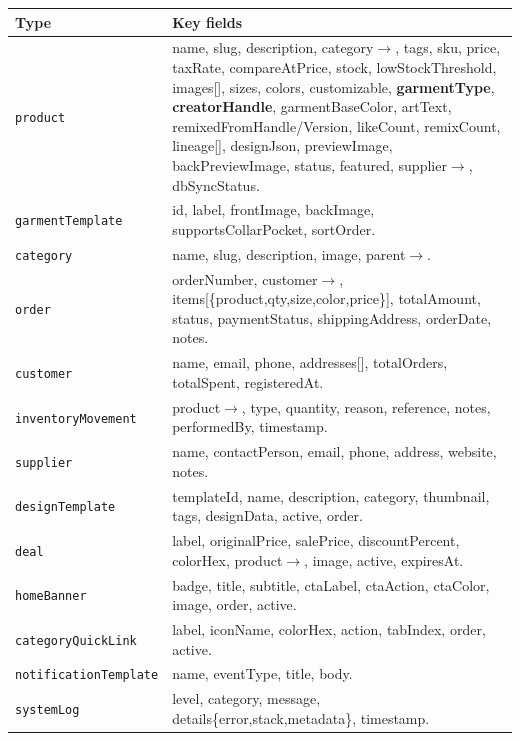\documentclass[11pt,a4paper]{report}
\newcommand{\code}[1]{\texttt{#1}}
\begin{document}
{\small
\begin{longtable}{@{}p{3.4cm}p{10.6cm}@{}}
\toprule
\textbf{Type} & \textbf{Key fields}\\
\midrule
\endhead
\code{product} & name, slug, description, category$\rightarrow$, tags, sku, price, taxRate,
  compareAtPrice, stock, lowStockThreshold, images[], sizes, colors, customizable,
  \textbf{garmentType}, \textbf{creatorHandle}, garmentBaseColor, artText,
  remixedFromHandle/Version, likeCount, remixCount, lineage[], designJson,
  previewImage, backPreviewImage, status, featured, supplier$\rightarrow$, dbSyncStatus.\\
\code{garmentTemplate} & id, label, frontImage, backImage, supportsCollarPocket, sortOrder.\\
\code{category} & name, slug, description, image, parent$\rightarrow$.\\
\code{order} & orderNumber, customer$\rightarrow$, items[\{product,qty,size,color,price\}],
  totalAmount, status, paymentStatus, shippingAddress, orderDate, notes.\\
\code{customer} & name, email, phone, addresses[], totalOrders, totalSpent, registeredAt.\\
\code{inventoryMovement} & product$\rightarrow$, type, quantity, reason, reference, notes, performedBy, timestamp.\\
\code{supplier} & name, contactPerson, email, phone, address, website, notes.\\
\code{designTemplate} & templateId, name, description, category, thumbnail, tags, designData, active, order.\\
\code{deal} & label, originalPrice, salePrice, discountPercent, colorHex, product$\rightarrow$, image, active, expiresAt.\\
\code{homeBanner} & badge, title, subtitle, ctaLabel, ctaAction, ctaColor, image, order, active.\\
\code{categoryQuickLink} & label, iconName, colorHex, action, tabIndex, order, active.\\
\code{notificationTemplate} & name, eventType, title, body.\\
\code{systemLog} & level, category, message, details\{error,stack,metadata\}, timestamp.\\
\bottomrule
\end{longtable}
}
\end{document}

